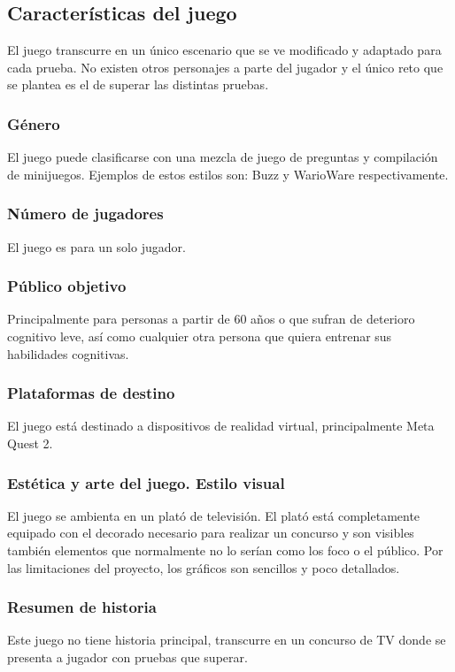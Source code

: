 \subsection{Características del juego}
El juego transcurre en un único escenario que se ve modificado y adaptado para cada prueba. No existen otros personajes a parte del jugador y el único reto que se plantea es el de superar las distintas pruebas.

\subsubsection{Género}
El juego puede clasificarse con una mezcla de juego de preguntas y compilación de minijuegos. Ejemplos de estos estilos son: Buzz y WarioWare respectivamente.

\subsubsection{Número de jugadores}
El juego es para un solo jugador.

\subsubsection{Público objetivo}
Principalmente para personas a partir de 60 años o que sufran de deterioro cognitivo leve, así como cualquier otra persona que quiera entrenar sus habilidades cognitivas.


\subsubsection{Plataformas de destino}
El juego está destinado a dispositivos de realidad virtual, principalmente Meta Quest 2.


\subsubsection{Estética y arte del juego. Estilo visual}
El juego se ambienta en un plató de televisión. El plató está completamente equipado con el decorado necesario para realizar un concurso y son visibles también elementos que normalmente no lo serían como los foco o el público. Por las limitaciones del proyecto, los gráficos son sencillos y poco detallados.

\subsubsection{Resumen de historia}
Este juego no tiene historia principal, transcurre en un concurso de TV donde se presenta a jugador con pruebas que superar.

